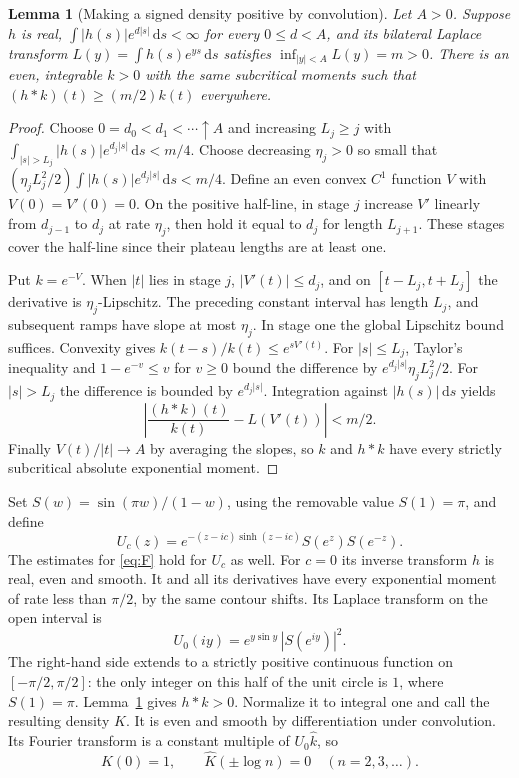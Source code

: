 \documentclass[11pt]{article}
\newtheorem{lemma}[theorem]{Lemma}
\newcommand{\dd}{\,\mathrm d}
\begin{document}
\begin{lemma}[Making a signed density positive by convolution]\label{lem:pos}
Let \(A>0\). Suppose \(h\) is real, \(\int |h(s)|e^{d|s|}\dd s<\infty\) for every \(0\le d<A\), and its bilateral Laplace transform \(L(y)=\int h(s)e^{ys}\dd s\) satisfies \(\inf_{|y|<A}L(y)=m>0\). There is an even, integrable \(k>0\) with the same subcritical moments such that
\((h*k)(t)\ge (m/2)k(t)\) everywhere.
\end{lemma}
\begin{proof}
Choose \(0=d_0<d_1<\cdots\uparrow A\) and increasing \(L_j\ge j\) with
\(\int_{|s|>L_j}|h(s)|e^{d_j|s|}\dd s<m/4\).
Choose decreasing \(\eta_j>0\) so small that
\((\eta_j L_j^2/2)\int |h(s)|e^{d_j|s|}\dd s<m/4\).
Define an even convex \(C^1\) function \(V\) with \(V(0)=V'(0)=0\).
On the positive half-line, in stage \(j\) increase \(V'\) linearly from \(d_{j-1}\) to \(d_j\) at rate \(\eta_j\), then hold it equal to \(d_j\) for length \(L_{j+1}\). These stages cover the half-line since their plateau lengths are at least one.

Put \(k=e^{-V}\). When \(|t|\) lies in stage \(j\), \(|V'(t)|\le d_j\), and on \([t-L_j,t+L_j]\) the derivative is \(\eta_j\)-Lipschitz. The preceding constant interval has length \(L_j\), and subsequent ramps have slope at most \(\eta_j\). In stage one the global Lipschitz bound suffices. Convexity gives
\(k(t-s)/k(t)\le e^{sV'(t)}\). For \(|s|\le L_j\), Taylor's inequality and \(1-e^{-v}\le v\) for \(v\ge0\) bound the difference by \(e^{d_j|s|}\eta_j L_j^2/2\). For \(|s|>L_j\) the difference is bounded by \(e^{d_j|s|}\). Integration against \(|h(s)|\dd s\) yields
\[
  \left|\frac{(h*k)(t)}{k(t)}-L(V'(t))\right|<m/2.
\]
Finally \(V(t)/|t|\to A\) by averaging the slopes, so \(k\) and \(h*k\) have every strictly subcritical absolute exponential moment.
\end{proof}

Set \(S(w)=\sin(\pi w)/(1-w)\), using the removable value \(S(1)=\pi\), and define
\[
 U_c(z)=e^{-(z-ic)\sinh(z-ic)}S(e^z)S(e^{-z}).
\]
The estimates for \eqref{eq:F} hold for \(U_c\) as well. For \(c=0\) its inverse transform \(h\) is real, even and smooth. It and all its derivatives have every exponential moment of rate less than \(\pi/2\), by the same contour shifts. Its Laplace transform on the open interval is
\[
                U_0(iy)=e^{y\sin y}\,|S(e^{iy})|^2 .
\]
The right-hand side extends to a strictly positive continuous function on \([-\pi/2,\pi/2]\): the only integer on this half of the unit circle is \(1\), where \(S(1)=\pi\). Lemma~\ref{lem:pos} gives \(h*k>0\). Normalize it to integral one and call the resulting density \(K\). It is even and smooth by differentiation under convolution. Its Fourier transform is a constant multiple of \(U_0\widehat k\), so
\begin{equation}\label{eq:kill}
                \widehat K(0)=1,\qquad
                \widehat K(\pm\log n)=0\quad(n=2,3,\ldots).
\end{equation}
\end{document}
